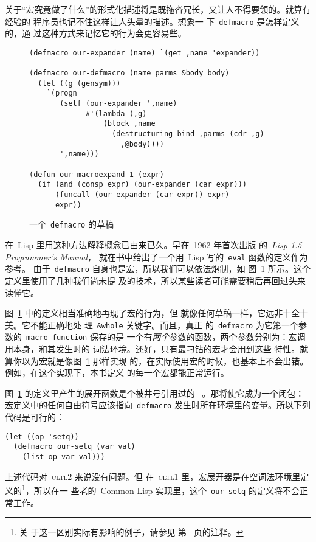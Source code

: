 关于``宏究竟做了什么''的形式化描述将是既拖沓冗长，又让人不得要领的。就算有经验的
程序员也记不住这样让人头晕的描述。想象一
下~\texttt{defmacro} 是怎样定义的，通
过这种方式来记忆它的行为会更容易些。

\begin{figure}
\begin{lstlisting}
(defmacro our-expander (name) `(get ,name 'expander))

(defmacro our-defmacro (name parms &body body)
  (let ((g (gensym)))
    `(progn
       (setf (our-expander ',name)
             #'(lambda (,g)
                 (block ,name
                   (destructuring-bind ,parms (cdr ,g)
                     ,@body))))
       ',name)))

(defun our-macroexpand-1 (expr)
  (if (and (consp expr) (our-expander (car expr)))
      (funcall (our-expander (car expr)) expr)
      expr))
\end{lstlisting}
\caption{\label{fig:a_sketch_of_defmacro}一个~\texttt{defmacro} 的草稿}
\end{figure}

在~Lisp 里用这种方法解释概念已由来已久。早在~1962 年首次出版
的~\emph{Lisp 1.5 Programmer's Manual}，
就在书中给出了一个用~Lisp 写的~\texttt{eval} 函数的定义作为参考。
由于~\texttt{defmacro} 自身也是宏，所以我们可以依法炮制，如
图~\ref{fig:a_sketch_of_defmacro} 所示。这个定义里使用了几种我们尚未提
及的技术，所以某些读者可能需要稍后再回过头来读懂它。

图~\ref{fig:a_sketch_of_defmacro} 中的定义相当准确地再现了宏的行为，但
就像任何草稿一样，它远非十全十美。它不能正确地处
理~\texttt{\&whole} 关键字。而且，真正
的~\texttt{defmacro} 为它第一个参数的~\texttt{macro-function} 保存的是
一个有\emph{两个}参数的函数，两个参数分别为：宏调用本身，和其发生时的
词法环境。还好，只有最刁钻的宏才会用到这些
特性。就算你以为宏就是像图~\ref{fig:a_sketch_of_defmacro} 那样实现
的，在实际使用宏的时候，也基本上不会出错。例如，在这个实现下，本书定义
的每一个宏都能正常运行。

图~\ref{fig:a_sketch_of_defmacro} 的定义里产生的展开函数是个被井号引用过的
~\lexpr。那将使它成为一个闭包：宏定义中的任何自由符号应该指向~\texttt{defmacro}
发生时所在环境里的变量。所以下列代码是可行的：
\begin{lstlisting}
(let ((op 'setq))
  (defmacro our-setq (var val)
    (list op var val)))
\end{lstlisting}
上述代码对~\textsc{cltl}2 来说没有问题。但
在~\textsc{cltl}1 里，宏展开器是在空词法环境里定义的\footnote{关
  于这一区别实际有影响的例子，请参见
  第~\pageref{notes:difference-null-environment} 页的注释。}，所以在一
些老的~Common Lisp 实现里，这个~\texttt{our-setq} 的定义将不会正常工作。

